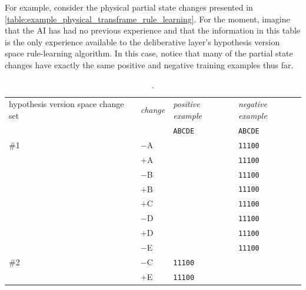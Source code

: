 For example, consider the physical partial state changes presented in
{\mbox{\autoref{table:example_physical_transframe_rule_learning}}}.
For the moment, imagine that the AI has had no previous experience and
that the information in this table is the only experience available to
the deliberative layer's hypothesis version space rule-learning
algorithm.  In this case, notice that many of the partial state
changes have exactly the same positive and negative training examples
thus far.
\begin{table}
\centering
\begin{tabular}{p{2cm}|p{1cm}|p{1.5cm}|p{1.5cm}|}
hypothesis version space change set & {\emph{change}}        & {\emph{positive example}}      & {\emph{negative example}}      \\
                                    &                        & {\tt{ABCDE}}                   & {\tt{ABCDE}}                   \\
\hline
\#1                                 & $-$A                   &                                & {\tt{11100}}                   \\
                                    & $+$A                   &                                & {\tt{11100}}                   \\
                                    & $-$B                   &                                & {\tt{11100}}                   \\
                                    & $+$B                   &                                & {\tt{11100}}                   \\
                                    & $+$C                   &                                & {\tt{11100}}                   \\
                                    & $-$D                   &                                & {\tt{11100}}                   \\
                                    & $+$D                   &                                & {\tt{11100}}                   \\
                                    & $-$E                   &                                & {\tt{11100}}                   \\
\hline
\#2                                 & $-$C                   & {\tt{11100}}                   &                                \\
                                    & $+$E                   & {\tt{11100}}                   &                                \\
\hline
\end{tabular}
\caption[.]{.}
\label{table:example_lazy_hypothesis_space_allocation}
\end{table}
